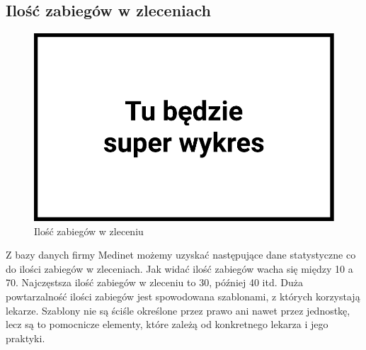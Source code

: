 \subsection{Ilość zabiegów w zleceniach}
\begin{figure}[h]
	\centering
	\includegraphics[width=\textwidth]{gfx/medinet-treatments-stats.pdf}
	\caption{Ilość zabiegów w zleceniu}
	\label{medinet-treatments-stats}
\end{figure}
Z bazy danych firmy Medinet możemy uzyskać następujące dane statystyczne co do
ilości zabiegów w zleceniach. Jak widać ilość zabiegów wacha się między 10 a 70.
Najczęstsza ilość zabiegów w zleceniu to 30, później 40 itd. Duża powtarzalność
ilości zabiegów jest spowodowana szablonami, z których korzystają lekarze.
Szablony nie są ściśle określone przez prawo ani nawet przez jednostkę, lecz są
to pomocnicze elementy, które zależą od konkretnego lekarza i jego praktyki.
\pagebreak
